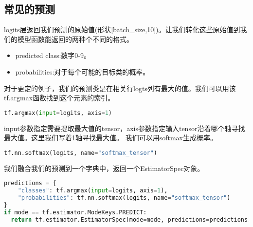 \subsection{常见的预测}
logits层返回我们预测的原始值(形状[batch\_size,10])。让我们转化这些原始值到我们的模型函数能返回的两种个不同的格式。
\begin{itemize}
\item predicted class:数字0-9。
\item probabilities:对于每个可能的目标类的概率。
\end{itemize}
对于更定的例子，我们的预测类是在相关行logts列有最大的值。我们可以用该tf.argmax函数找到这个元素的索引。
\begin{lstlisting}[language=Python]
tf.argmax(input=logits, axis=1)
\end{lstlisting}
input参数指定需要提取最大值的tensor，axis参数指定输入tensor沿着哪个轴寻找最大值。这里我们写着1轴寻找最大值。
我们可以用softmax生成概率。
\begin{lstlisting}[language=Python]
tf.nn.softmax(logits, name="softmax_tensor")
\end{lstlisting}
我们融合我们的预测到一个字典中，返回一个EstimatorSpec对象。
\begin{lstlisting}[language=Python]
predictions = {
    "classes": tf.argmax(input=logits, axis=1),
    "probabilities": tf.nn.softmax(logits, name="softmax_tensor")
}
if mode == tf.estimator.ModeKeys.PREDICT:
  return tf.estimator.EstimatorSpec(mode=mode, predictions=predictions)
\end{lstlisting}
